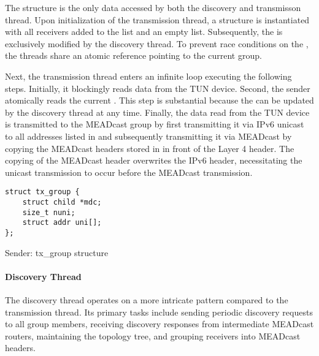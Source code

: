 The  structure is the only data accessed by both the
    discovery and transmisson thread.
Upon initialization of the transmission thread, a 
    structure is instantiated with all receivers added to the 
    list and an empty  list.
Subsequently, the  is exclusively modified by the discovery
    thread.
To prevent race conditions on the , the threads share an
    atomic reference pointing to the current group.

Next, the transmission thread enters an infinite loop executing the following
    steps.
Initially, it blockingly reads data from the TUN device.
Second, the sender atomically reads the current .
This step is substantial because the  can be updated by
    the discovery thread at any time.
Finally, the data read from the TUN device is transmitted to the MEADcast group
    by first transmitting it via IPv6 unicast to all addresses listed in
     and subsequently transmitting it via MEADcast by copying
    the MEADcast headers stored in  in front of the Layer 4
    header.
The copying of the MEADcast header overwrites the IPv6 header, necessitating
    the unicast transmission to occur before the MEADcast transmission.

\begin{listing}
\begin{verbatim}
struct tx_group {
    struct child *mdc;
    size_t nuni;
    struct addr uni[];
};
\end{verbatim}
    \caption{Sender: tx\_group structure}
    \label{lst:txg_struct}
\end{listing}


\paragraph{Discovery Thread} %
\label{par:Discovery Thread}

The discovery thread operates on a more intricate pattern compared to the
    transmission thread.
Its primary tasks include sending periodic discovery requests to all group
    members, receiving discovery responses from intermediate MEADcast routers,
    maintaining the topology tree, and grouping receivers into MEADcast
    headers.

